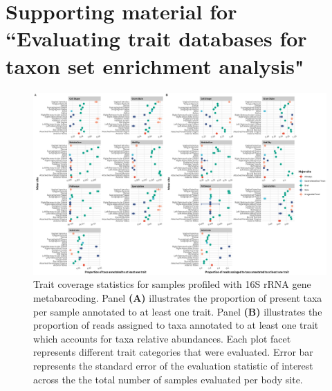\chapter{Supporting material for ``Evaluating trait databases for taxon set enrichment analysis"}

\begin{figure}
    \centering
    \includegraphics[width=\linewidth]{figures/appD_fs1.eps}
    \caption[Trait coverage statistics for samples profiled with 16S rRNA gene metabarcoding]{Trait coverage statistics for samples profiled with 16S rRNA gene metabarcoding. Panel \textbf{(A)} illustrates the proportion of present taxa per sample annotated to at least one trait. Panel \textbf{(B)} illustrates the proportion of reads assigned to taxa annotated to at least one trait which accounts for taxa relative abundances. Each plot facet represents different trait categories that were evaluated. Error bar represents the standard error of the evaluation statistic of interest across the the total number of samples evaluated per body site.}
    \label{fig:d1}
\end{figure}

